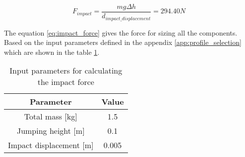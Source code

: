 \begin{equation}
\label{eq:impact_force}
  F_{impact} = \frac{m g \Delta h}{d_{impact\_displacement}} = 294.40 N 
\end{equation}

The equation \ref{eq:impact_force} gives the force for sizing all the components.
Based on the input parameters defined in the appendix \ref{app:profile_selection} which are shown in the table \ref{tab:input_parameter_impact_force}.
\begin{table}
\begin{center}
\begin{tabular}{c | c}
  Parameter & Value \\
  \hline
  Total mass [kg] & 1.5 \\
  Jumping height [m] & 0.1 \\
  Impact displacement [m] & 0.005
\end{tabular}
\caption{Input parameters for calculating the impact force}
\label{tab:input_parameter_impact_force}
\end{center}
\end{table}
